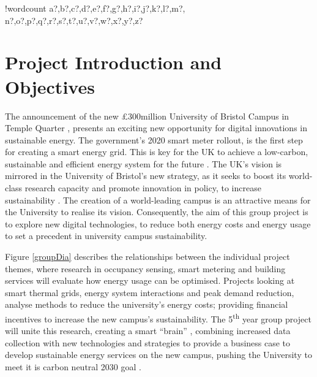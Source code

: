 \documentclass[fontsize=9.5pt]{extarticle}
\numberwithin{figure}{section} %
\newcounter{words}
\newenvironment{counted}{%
  \setcounter{words}{0}
  \SearchList!{wordcount}{\stepcounter{words}}
    {a?,b?,c?,d?,e?,f?,g?,h?,i?,j?,k?,l?,m?,
    n?,o?,p?,q?,r?,s?,t?,u?,v?,w?,x?,y?,z?}
  \UndoBoundary{'}
  \SearchOrder{p;}}{%
  \StopSearching}
\begin{document}
\clearpage
\cfoot{\thepage}
\begin{counted} %
\section{Project Introduction and
Objectives}\label{project-introduction-and-objectives}

The announcement of the new £300million University of Bristol Campus in
Temple Quarter \cite{November58:online}, presents an exciting new
opportunity for digital innovations in sustainable energy. The
government's 2020 smart meter rollout, is the first step for creating a
smart energy grid. This is key for the UK to achieve a low-carbon,
sustainable and efficient energy system for the future
\cite{SmartEne79:online}. The UK's vision is mirrored in the University
of Bristol's new strategy, as it seeks to boost its world-class research
capacity and promote innovation in policy, to increase sustainability
\cite{universi93:online}. The creation of a world-leading campus is an
attractive means for the University to realise its vision. Consequently,
the aim of this group project is to explore new digital technologies, to
reduce both energy costs and energy usage to set a precedent in
university campus sustainability.

Figure \ref{groupDia} describes the relationships between the individual
project themes, where research in occupancy sensing, smart metering and
building services will evaluate how energy usage can be optimised.
Projects looking at smart thermal grids, energy system interactions and
peak demand reduction, analyse methods to reduce the university's energy
costs; providing financial incentives to increase the new campus's
sustainability. The 5\textsuperscript{th} year group project will unite
this research, creating a smart ``brain'' \cite{pbmeet}, combining
increased data collection with new technologies and strategies to
provide a business case to develop sustainable energy services on the
new campus, pushing the University to meet it is carbon neutral 2030
goal \cite{universi93:online}.


\end{counted}
\end{document}
